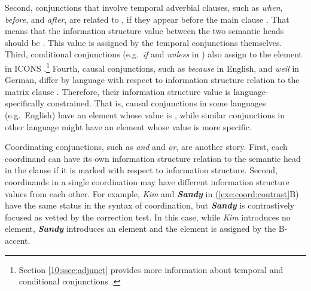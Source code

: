 \noindent Second, conjunctions that involve temporal adverbial
clauses, such as \textit{when}, \textit{before}, and \textit{after},
are related to , if they appear before the main clause
\citep{haiman:78}.  That means that the information structure value
between the two semantic heads should be . This value is
assigned by the temporal conjunctions themselves.  Third, conditional
conjunctions (e.g.\ \textit{if} and \textit{unless} in )
also assign  to the element in ICONS
\citep{ramsay:87}.\footnote{Section \ref{10:ssec:adjunct} provides more
  information about temporal and conditional
  conjunctions .}  Fourth, causal
conjunctions, such as \textit{because} in English, and \textit{weil}
in German, differ by language with respect to information structure
relation to the matrix clause \citep{heycock:07}. Therefore, their
information structure value is language-specifically
constrained. That is, causal conjunctions in
some languages (e.g.\ English) have an  element whose value
is , while similar conjunctions in other language might
have an  element whose value is more specific.










Coordinating conjunctions, such as \textit{and} and \textit{or}, are
another story. First, each coordinand can have its own information
structure relation to the semantic head in the clause if it is marked
with respect to information structure.  Second, coordinands in a
single coordination may have different information structure values
from each other. For example, \textit{Kim} and \textit{\textbf{Sandy}}
in (\ref{exe:coord:contrast}B) have the same status in the syntax of
coordination, but \textit{\textbf{Sandy}} is contrastively focused as
vetted by the correction test. In this case, while \textit{Kim}
introduces no  element, \textit{\textbf{Sandy}} introduces
an  element and the element is assigned
 by the B-accent.





